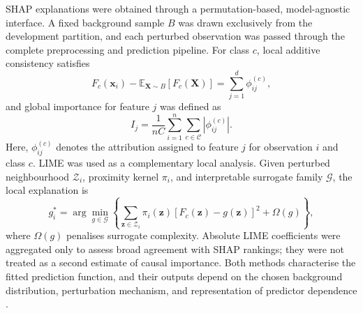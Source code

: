\documentclass[a4paper,fleqn]{cas-dc}
\begin{document}
SHAP explanations were obtained through a permutation-based, model-agnostic interface. A fixed background sample $B$ was drawn exclusively from the development partition, and each perturbed observation was passed through the complete preprocessing and prediction pipeline. For class $c$, local additive consistency satisfies
\begin{equation}
F_c(\mathbf{x}_i)-\mathbb{E}_{\mathbf{X}\sim B}[F_c(\mathbf{X})]
=\sum_{j=1}^{d}\phi_{ij}^{(c)},
\label{eq:shaplocal}
\end{equation}
and global importance for feature $j$ was defined as
\begin{equation}
I_j=\frac{1}{nC}\sum_{i=1}^{n}\sum_{c\in\mathcal{C}}|\phi_{ij}^{(c)}|.
\label{eq:shapglobal}
\end{equation}
Here, $\phi_{ij}^{(c)}$ denotes the attribution assigned to feature $j$ for observation $i$ and class $c$. LIME was used as a complementary local analysis. Given perturbed neighbourhood $\mathcal{Z}_i$, proximity kernel $\pi_i$, and interpretable surrogate family $\mathcal{G}$, the local explanation is
\begin{equation}
g_i^{*}=\arg\min_{g\in\mathcal{G}}
\left\{\sum_{\mathbf{z}\in\mathcal{Z}_i}\pi_i(\mathbf{z})
[F_c(\mathbf{z})-g(\mathbf{z})]^2+\Omega(g)\right\},
\label{eq:lime}
\end{equation}
where $\Omega(g)$ penalises surrogate complexity. Absolute LIME coefficients were aggregated only to assess broad agreement with SHAP rankings; they were not treated as a second estimate of causal importance. Both methods characterise the fitted prediction function, and their outputs depend on the chosen background distribution, perturbation mechanism, and representation of predictor dependence \cite{instanceshap2023,jung2023}.
\end{document}
